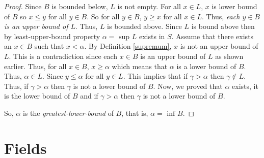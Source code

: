 \begin{proof}
	Since $B$ is bounded below, $L$ is not empty.
	\bigbreak
	For all $x \in L$, $x$ is lower bound of $B$ so $x \leq y$ for all $y \in B$.
	So for all $y \in B$, $y \geq x$ for all $x \in L$.
	Thus, {\it each $y \in B$ is an upper bound of $L$}.
	Thus, $L$ is bounded above.
	\bigbreak
	Since $L$ is bound above then by least-upper-bound property $\alpha = \text{ sup } L$ exists in $S$.
	\bigbreak
	Assume that there exists an $x \in B$ such that $x < \alpha$.
	By Definition \ref{supremum}, $x$ is not an upper bound of $L$.
	This is a contradiction since each $x \in B$ is an upper bound of $L$ as shown earlier.
	\bigbreak
	Thus, for all $x \in B$, $x \geq \alpha$ which means that $\alpha$ is a lower bound of $B$.
	Thus, $\alpha \in L$.
	\bigbreak
	Since $y \leq \alpha$ for all $y \in L$.
	This implies that if $\gamma > \alpha$ then $\gamma \notin L$.
	Thus, if $\gamma > \alpha$ then $\gamma$ is not a lower bound of $B$.
	\bigbreak
	Now, we proved that $\alpha$ exists, it is the lower bound of $B$ and if $\gamma > \alpha$
	then $\gamma$ is not a lower bound of $B$.

	So, $\alpha$ is the {\it greatest-lower-bound} of $B$, that is, $\alpha = \text{ inf } B$.
\end{proof}


\section{Fields}

